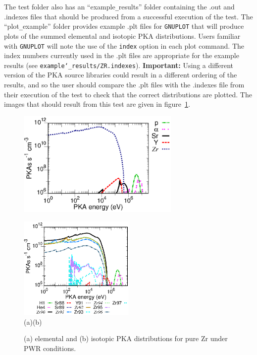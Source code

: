 \documentclass[a4paper]{article}
\begin{document}
The test folder also has an ``example\verb|_|results'' folder containing the .out and .indexes files that should be produced from a successful execution of the test. The ``plot\verb|_|example'' folder provides example .plt files for \texttt{GNUPLOT} that will produce plots of the summed elemental and isotopic PKA distributions. Users familiar with \texttt{GNUPLOT} will note the use of the \texttt{index} option in each plot command. The index numbers currently used in the .plt files are appropriate for the example results (see \texttt{example\char`_results/ZR.indexes}). \textbf{Important:} Using a different version of the PKA source libraries could result in a different ordering of the results, and so the user should compare the .plt files with the .indexes file from their execution of the test to check that the correct distributions are plotted. The images that should result from this test are given in figure~\ref{pka_graphs}.




\begin{figure}[t]
\hskip-1.5cm
\parbox[b][7cm][t]{0.7\textwidth}{\includegraphics[width=0.7\textwidth]
{ZR_elemental}}%
\includegraphics[width=0.5\textwidth]
{ZR_isotope}\\
\vskip-1.0cm
\hskip-0.5cm(a)\hskip7.2cm(b)
\caption{\label{pka_graphs}(a) elemental and (b) isotopic PKA distributions for pure Zr under PWR conditions.}
\end{figure}
\end{document}
